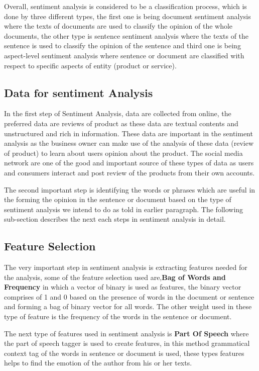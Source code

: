 \documentclass[sigconf]{acmart}
\begin{document}
Overall, sentiment analysis is considered to be a classification process, which is done by three different types, the first one is being document sentiment analysis where the texts of documents are used to classify the opinion of the whole documents, the other type is sentence sentiment analysis where the texts of the sentence is used to classify the opinion of the sentence and third one is being aspect-level sentiment analysis where sentence or document are classified with respect to specific aspects of entity (product or service). 
\subsection{Data for sentiment Analysis}
In the first step of Sentiment Analysis, data are collected from online, the preferred data are reviews of product as these data are textual contents and unstructured and rich in information. These data are important in the sentiment analysis as the business owner can make use of the analysis of these data (review of product) to learn about users opinion about the product. The social media network are one of the good and important source of these types of data as users and consumers interact and post review of the products from their own accounts. 

The second important step is identifying the words or phrases which are useful in the forming the opinion in the sentence or document based on the type of sentiment analysis we intend to do as told in earlier paragraph. The following sub-section describes the next each steps in sentiment analysis in detail.

\subsection{Feature Selection}
The very important step in sentiment analysis is extracting features needed for the analysis, some of the feature selection used are,\textbf{Bag of Words and Frequency} in which a vector of binary is used as features, the binary vector comprises of 1 and 0 based on the presence of words in the document or sentence and forming a bag of binary vector for all words. The other weight used in these type of feature is the frequency of the words in the sentence or document. 

The next type of features used in sentiment analysis is \textbf{Part Of Speech} where the part of speech tagger is used to create features, in this method grammatical context tag of the words in sentence or document is used, these types features helps to find the emotion of the author from his or her texts.
\end{document}
